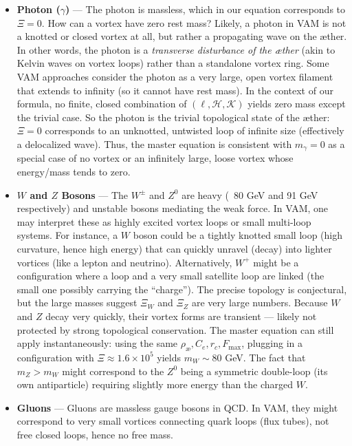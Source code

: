     \begin{itemize}
        \item \textbf{Photon ($\gamma$)} — The photon is massless, which in our equation corresponds to $\Xi=0$. How can a vortex have zero rest mass? Likely, a photon in VAM is not a knotted or closed vortex at all, but rather a propagating wave on the æther. In other words, the photon is a \textit{transverse disturbance of the æther} (akin to Kelvin waves on vortex loops) rather than a standalone vortex ring. Some VAM approaches consider the photon as a very large, open vortex filament that extends to infinity (so it cannot have rest mass). In the context of our formula, no finite, closed combination of $(\ell,\mathcal{H},\mathcal{K})$ yields zero mass except the trivial case. So the photon is the trivial topological state of the æther: $\Xi=0$ corresponds to an unknotted, untwisted loop of infinite size (effectively a delocalized wave). Thus, the master equation is consistent with $m_\gamma=0$ as a special case of no vortex or an infinitely large, loose vortex whose energy/mass tends to zero.

        \item \textbf{$W$ and $Z$ Bosons} — The $W^\pm$ and $Z^0$ are heavy (~80 GeV and 91 GeV respectively) and unstable bosons mediating the weak force. In VAM, one may interpret these as highly excited vortex loops or small multi-loop systems. For instance, a $W$ boson could be a tightly knotted small loop (high curvature, hence high energy) that can quickly unravel (decay) into lighter vortices (like a lepton and neutrino). Alternatively, $W^+$ might be a configuration where a loop and a very small satellite loop are linked (the small one possibly carrying the “charge”). The precise topology is conjectural, but the large masses suggest $\Xi_{W}$ and $\Xi_{Z}$ are very large numbers. Because $W$ and $Z$ decay very quickly, their vortex forms are transient — likely not protected by strong topological conservation. The master equation can still apply instantaneously: using the same $\rho_{\text{\ae}},C_e,r_c,F_{\max}$, plugging in a configuration with $\Xi \approx 1.6 \times 10^{5}$ yields $m_W \sim 80$ GeV. The fact that $m_Z > m_W$ might correspond to the $Z^0$ being a symmetric double-loop (its own antiparticle) requiring slightly more energy than the charged $W$.

        \item \textbf{Gluons} — Gluons are massless gauge bosons in QCD. In VAM, they might correspond to very small vortices connecting quark loops (flux tubes), not free closed loops, hence no free mass.


\end{itemize}
